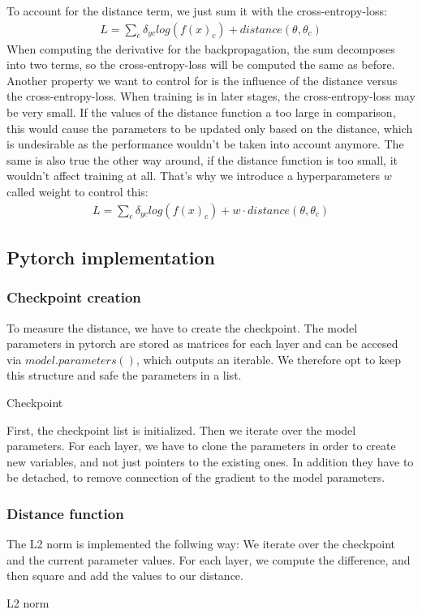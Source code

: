 To account for the distance term, we just sum it with the cross-entropy-loss:
\begin{align}
    L=\sum_{c} \delta_{yc} log(f(x)_c) + distance(\theta, \theta_c)
\end{align}
When computing the derivative for the backpropagation, the sum decomposes into
two terms, so the cross-entropy-loss will be computed the same as before.
Another property we want to control for is the influence of the distance versus
the cross-entropy-loss. When training is in later stages, the cross-entropy-loss
may be very small. If the values of the distance function a too large in
comparison, this would cause the parameters to be updated only based on the
distance, which is undesirable as the performance wouldn't be taken into account
anymore. The same is also true the other way around, if the distance function is
too small, it wouldn't affect training at all. That's why we introduce a
hyperparameters $w$ called weight to control this:
\begin{align}
    L=\sum_{c} \delta_{yc} log(f(x)_c) + w \cdot distance(\theta, \theta_c)
\end{align}

\subsection{Pytorch implementation}

\subsubsection{Checkpoint creation}
To measure the distance, we have to create the checkpoint. The model parameters
in pytorch are stored as matrices for each layer and can be accesed via
$model.parameters()$, which outputs an iterable. We therefore opt to keep this
structure and safe the parameters in a list.
\begin{algorithm}[htbp]
    \caption{Checkpoint}\label{alg:Checkpoint}
    \lstset{language=Python}
    
\end{algorithm}
\newline
First, the checkpoint list is initialized. Then we iterate over the model
parameters. For each layer, we have to clone the parameters in order to create
new variables, and not just pointers to the existing ones. In addition they have
to be detached, to remove connection of the gradient to the model parameters.

\subsubsection{Distance function}
The L2 norm is implemented the follwing way: We iterate over the checkpoint and
the current parameter values. For each layer, we compute the difference, and
then square and add the values to our distance.
\begin{algorithm}[htbp]
    \caption{L2 norm}\label{alg:L2Norm}
    \lstset{language=Python}
    
\end{algorithm}



